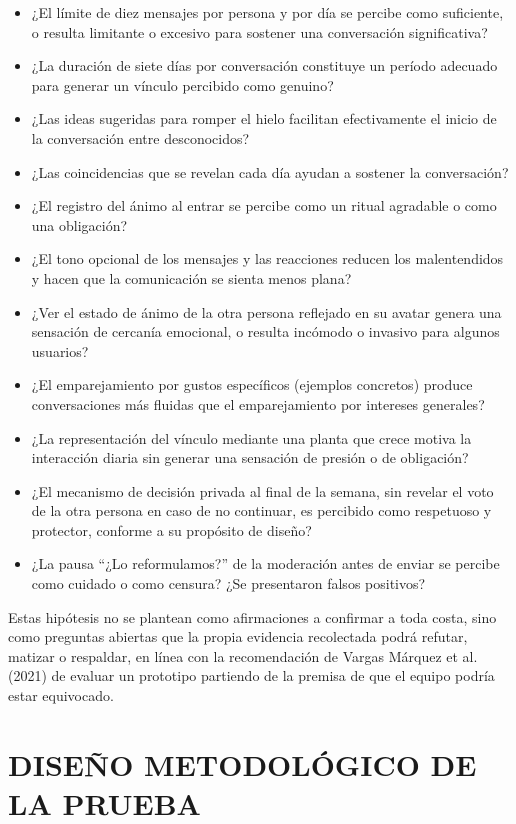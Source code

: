 \begin{itemize}
    \item ¿El límite de diez mensajes por persona y por día se percibe como suficiente, o resulta limitante o excesivo para sostener una conversación significativa?
    \item ¿La duración de siete días por conversación constituye un período adecuado para generar un vínculo percibido como genuino?
    \item ¿Las ideas sugeridas para romper el hielo facilitan efectivamente el inicio de la conversación entre desconocidos?
    \item ¿Las coincidencias que se revelan cada día ayudan a sostener la conversación?
    \item ¿El registro del ánimo al entrar se percibe como un ritual agradable o como una obligación?
    \item ¿El tono opcional de los mensajes y las reacciones reducen los malentendidos y hacen que la comunicación se sienta menos plana?
    \item ¿Ver el estado de ánimo de la otra persona reflejado en su avatar genera una sensación de cercanía emocional, o resulta incómodo o invasivo para algunos usuarios?
    \item ¿El emparejamiento por gustos específicos (ejemplos concretos) produce conversaciones más fluidas que el emparejamiento por intereses generales?
    \item ¿La representación del vínculo mediante una planta que crece motiva la interacción diaria sin generar una sensación de presión o de obligación?
    \item ¿El mecanismo de decisión privada al final de la semana, sin revelar el voto de la otra persona en caso de no continuar, es percibido como respetuoso y protector, conforme a su propósito de diseño?
    \item ¿La pausa ``¿Lo reformulamos?'' de la moderación antes de enviar se percibe como cuidado o como censura? ¿Se presentaron falsos positivos?
\end{itemize}

Estas hipótesis no se plantean como afirmaciones a confirmar a toda costa, sino como preguntas abiertas que la propia evidencia recolectada podrá refutar, matizar o respaldar, en línea con la recomendación de Vargas Márquez et al. (2021) de evaluar un prototipo partiendo de la premisa de que el equipo podría estar equivocado.

\section{DISEÑO METODOLÓGICO DE LA PRUEBA}
